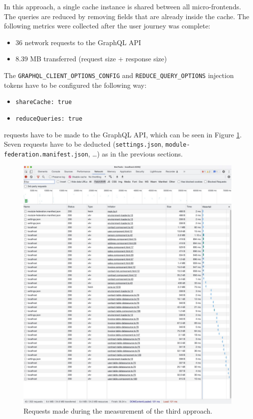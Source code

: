 In this approach, a single cache instance is shared between all micro-frontends. The queries are reduced by removing fields that are already inside the cache. The following metrics were collected after the user journey was complete:

\begin{itemize}
  \item 36 network requests to the GraphQL \ac{API}
  \item 8.39 MB transferred (request size + response size)
\end{itemize}

\noindent The \texttt{GRAPHQL\_CLIENT\_OPTIONS\_CONFIG} and \texttt{REDUCE\_QUERY\_OPTIONS} injection tokens have to be configured the following way:

\begin{itemize}
  \item \texttt{shareCache: true}
  \item \texttt{reduceQueries: true}
\end{itemize}

 requests have to be made to the GraphQL \ac{API}, which can be seen in Figure \ref{fig:results:shared-cache-reduction}. Seven requests have to be deducted (\texttt{settings.json}, \texttt{module-federation.manifest.json}, \dots) as in the previous sections.

\ifshowImages
\begin{figure}[H]
  \centering
  \includegraphics[width=0.75\linewidth]{images/results/1-attempt/shared-reduced-cache.jpg}
  \caption{Requests made during the measurement of the third approach.}\label{fig:results:shared-cache-reduction}
\end{figure}
\fi

